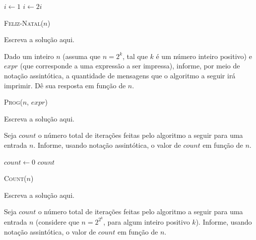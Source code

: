 \documentclass[a4paper]{exam}
\DeclarePairedDelimiter{\floor}{\lfloor}{\rfloor}
\begin{document}
\begin{questions}
  \begin{algorithm}[H]
    \NoCaptionOfAlgo
    \DontPrintSemicolon

    $i \leftarrow 1$\;
     {
      $i \leftarrow 2i$\;
    }
    \caption{\textsc{Feliz-Natal}($n$)}
  \end{algorithm}
  \begin{solution}
    Escreva a solução aqui.
  \end{solution}
  \question Dado um inteiro $n$ (assuma que $n=2^k$, tal que
  $k$ é um número inteiro positivo) e $expr$ (que corresponde a uma
  expressão a ser impressa), informe, por meio de notação assintótica,
  a quantidade de mensagens que o algoritmo a seguir irá
  imprimir. Dê sua resposta em função de $n$.

  \begin{algorithm}[H]
    \NoCaptionOfAlgo
    \DontPrintSemicolon

    \caption{\textsc{Prog}($n$, $expr$)}
  \end{algorithm}
  \begin{solution}
    Escreva a solução aqui.
  \end{solution}
  \question Seja $count$ o número total de iterações feitas pelo
  algoritmo a seguir para uma entrada $n$. Informe, usando
  notação assintótica, o valor de $count$ em função de $n$.

  \begin{algorithm}[H]
    \NoCaptionOfAlgo
    \DontPrintSemicolon

    $count \gets 0$\;
    \Return $count$\;
    \caption{\textsc{Count}($n$)}
  \end{algorithm}
  \begin{solution}
    Escreva a solução aqui.
  \end{solution}
  \question Seja $count$ o número total de iterações feitas pelo
  algoritmo a seguir para uma entrada $n$ (considere que $n = 2^{2^{k}}$,
  para algum inteiro positivo $k$). Informe, usando
  notação assintótica, o valor de $count$ em função de $n$.
  
  \begin{algorithm}[H]
    \NoCaptionOfAlgo
    \DontPrintSemicolon


\end{algorithm}
\end{questions}
\end{document}
